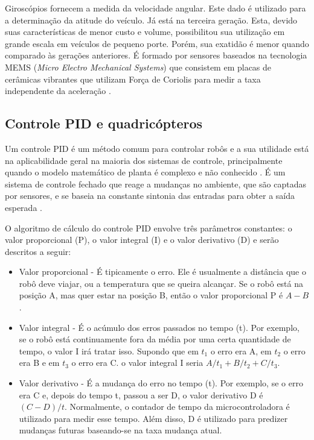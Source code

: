 \documentclass[a4paper, 12pt]{article}
\begin{document}
Giroscópios fornecem a medida da velocidade angular. Este dado é utilizado para a determinação da atitude do veículo. Já está na terceira geração. Esta, devido suas características de menor custo e volume, possibilitou sua utilização em grande escala em veículos de pequeno porte. Porém, sua exatidão é menor quando comparado às gerações anteriores. É formado por sensores baseados na tecnologia MEMS (\textit{Micro Electro Mechanical Systems}) que consistem em placas de cerâmicas vibrantes que utilizam Força de Coriolis para medir a taxa independente da aceleração \cite{Adalberto2009}.

\subsection{Controle PID e quadricópteros}

\label{subsec:PID}

Um controle PID é um método comum para controlar robôs e a sua utilidade está na aplicabilidade geral na maioria dos sistemas de controle, principalmente quando o modelo matemático de planta é complexo e não conhecido \cite{Ogata2003}. É um sistema de controle fechado que reage a mudanças no ambiente, que são captadas por sensores, e se baseia na constante sintonia das entradas para obter a saída esperada \cite{Kingdom}.  

O algoritmo de cálculo do controle PID envolve três parâmetros constantes: o valor proporcional (P), o valor integral (I) e o valor derivativo (D) e serão descritos a seguir:

\begin{itemize}
\item
Valor proporcional - É tipicamente o erro. Ele é usualmente a distância que o robô deve viajar, ou a temperatura que se queira alcançar. Se o robô está na posição A, mas quer estar na posição B, então o valor proporcional P é $A - B$.
\item
Valor integral - É o acúmulo dos erros passados no tempo (t). Por exemplo, se o robô está continuamente fora da média por uma certa quantidade de tempo, o valor I irá tratar isso. Supondo que em $t_1$ o erro era A, em $t_2$ o erro era B e em $t_3$ o erro era C. o valor integral I seria $A/t_1 + B/t_2 + C/t_3$.
\item
Valor derivativo - É a mudança do erro no tempo (t). Por exemplo, se o erro era C e, depois do tempo t, passou a ser D, o valor derivativo D é $(C-D)/t$. Normalmente, o contador de tempo da microcontroladora é utilizado para medir esse tempo. Além disso, D é utilizado para predizer mudanças futuras baseando-se na taxa mudança atual.
\end{itemize}
\end{document}
